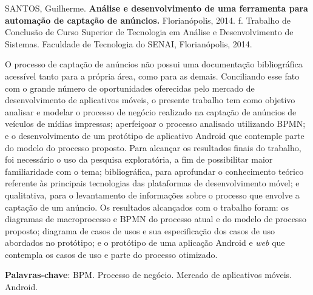 
\noindent
SANTOS, Guilherme. \textbf{Análise e desenvolvimento de uma ferramenta para automação de captação de anúncios.}
Florianópolis, 2014. \pageref{nropaginas}f. Trabalho de Conclusão de Curso Superior de Tecnologia em
Análise e Desenvolvimento de Sistemas. Faculdade de Tecnologia do SENAI, Florianópolis, 2014.

\vspace{1cm}
\setlength{\absparsep}{18pt} %
\begin{resumo}
O processo de captação de anúncios não possui uma documentação bibliográfica acessível tanto para a própria área, como para as demais. Conciliando esse fato com o grande número de oportunidades oferecidas pelo mercado de desenvolvimento de aplicativos móveis, o presente trabalho tem como objetivo analisar e modelar o processo de negócio realizado na captação de anúncios de veículos de mídias impressas; aperfeiçoar o processo analisado utilizando BPMN; e o desenvolvimento de um protótipo de aplicativo Android que contemple parte do modelo do processo proposto. Para alcançar os resultados finais do trabalho, foi necessário o uso da pesquisa exploratória, a fim de possibilitar maior familiaridade com o tema; bibliográfica, para aprofundar o conhecimento teórico referente às principais tecnologias das plataformas de desenvolvimento móvel; e qualitativa, para o levantamento de informações sobre o processo que envolve a captação de um anúncio. Os resultados alcançados com o trabalho foram: os diagramas de macroprocesso e BPMN do processo atual e do modelo de processo proposto; diagrama de casos de usos e sua especificação dos casos de uso abordados no protótipo; e o protótipo de uma aplicação Android e \textit{web} que contempla os casos de uso e parte do processo otimizado.

 \textbf{Palavras-chave}: BPM. Processo de negócio. Mercado de aplicativos móveis. Android.
\end{resumo}
